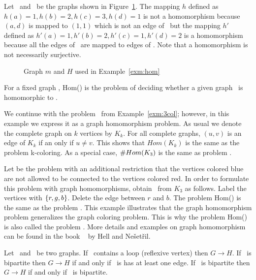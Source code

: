 \begin{example}\label{exm:hom}
Let \mG\ and \mH\ be the graphs shown in Figure~\ref{fig:hom}\@. The mapping \(h\)
defined as \(h(a)=1, h(b)=2, h(c)=3, h(d)=1\)
is not a homomorphism because \((a,d)\) is mapped to \((1,1)\) which is not an 
edge of \mH\ but the mapping \(h'\) defined as \(h'(a)=1, h'(b)=2, h'(c)=1, h'(d)=2\) 
is a homomorphism because all the edges of \mG\ are mapped to edges of \mH. 
Note that a homomorphism is not necessarily surjective.

\begin{figure}[h]
\center
\caption{Graph \ensuremath{m} and \ensuremath{H} used in Example~\ref{exm:hom}} \label{fig:hom}
\end{figure}
\end{example}

\begin{defi}[Hom(\mH)]
For a fixed graph \mH, Hom(\mH) is the problem of deciding whether a given graph \mG\
is homomorphic to \mH\@.
\end{defi}

\begin{example}[\tcoloring]
We continue with the problem \tcoloring\ from Example~\ref{exm:3col}; however, in this example 
we express it as a graph homomorphism problem. As usual we denote the complete graph
on \(k\) vertices by \(K_k\)\@. For all complete graphs, \((u,v)\) is an edge of \(K_k\)
if an only
if \(u\neq v\)\@. This shows that \(Hom(K_k)\) is the same as
the problem k-coloring. As a special case, \(\#Hom(K_3)\) is the same as problem \ctcol\@.
\end{example}

Let  be the problem  with an additional
restriction that the vertices colored blue are not allowed to be connected 
to the vertices colored red. In order to formulate this problem with graph homomorphisms,
obtain \mH\ from \(K_3\) as follows. Label the vertices with \(\{{r,g,b}\}\)\@.
Delete the edge between \(r\) and \(b\). The problem Hom(\mH) is the same as
the problem \pname{N0RB-3-Coloring}\@.
This example illustrates that the graph homomorphism problem generalizes the graph coloring problem.
This is why
the problem Hom(\mH) is also called the problem \@.
More details and examples on graph homomorphism 
can be found in the book ~\cite{hellbook} by Hell and Ne\v{s}et\v{r}il.

\begin{obs}\label{obs:hom}
Let \mG\ and \mH\ be two graphs.
If \mH\ contains a loop (reflexive vertex) then \(G \to H\)\@.
If \mG\ is bipartite then \(G \to H\) if and only if \mH\ is has at least one edge.
If \mH\ is bipartite then \(G \to H\) if and only if \mG\ is bipartite.
\end{obs}

